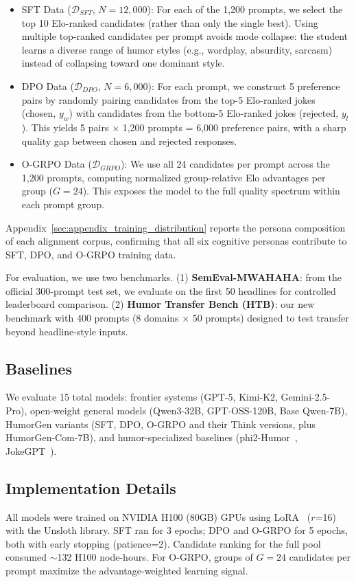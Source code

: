 \documentclass[11pt]{article}
\begin{document}
\begin{itemize}
    \item SFT Data ($\mathcal{D}_{SFT}$, $N=12,000$): For each of the 1,200 prompts, we select the top 10 Elo-ranked candidates (rather than only the single best). Using multiple top-ranked candidates per prompt avoids mode collapse: the student learns a diverse range of humor styles (e.g., wordplay, absurdity, sarcasm) instead of collapsing toward one dominant style.
    \item DPO Data ($\mathcal{D}_{DPO}$, $N=6,000$): For each prompt, we construct 5 preference pairs by randomly pairing candidates from the top-5 Elo-ranked jokes (chosen, $y_w$) with candidates from the bottom-5 Elo-ranked jokes (rejected, $y_l$). This yields 5 pairs $\times$ 1,200 prompts = 6,000 preference pairs, with a sharp quality gap between chosen and rejected responses.
    \item O-GRPO Data ($\mathcal{D}_{GRPO}$): We use all 24 candidates per prompt across the 1,200 prompts, computing normalized group-relative Elo advantages per group ($G=24$). This exposes the model to the full quality spectrum within each prompt group.
\end{itemize}
Appendix~\ref{sec:appendix_training_distribution} reports the persona composition of each alignment corpus, confirming that all six cognitive personas contribute to SFT, DPO, and O-GRPO training data.

For evaluation, we use two benchmarks. (1) \textbf{SemEval-MWAHAHA}: from the official 300-prompt test set, we evaluate on the first 50 headlines for controlled leaderboard comparison. (2) \textbf{Humor Transfer Bench (HTB)}: our new benchmark with 400 prompts (8 domains $\times$ 50 prompts) designed to test transfer beyond headline-style inputs.

\subsection{Baselines}
We evaluate 15 total models: frontier systems (GPT-5, Kimi-K2, Gemini-2.5-Pro), open-weight general models (Qwen3-32B, GPT-OSS-120B, Base Qwen-7B), HumorGen variants (SFT, DPO, O-GRPO and their Think versions, plus HumorGen-Com-7B), and humor-specialized baselines (phi2-Humor~\cite{abbas2026phi2humor}, JokeGPT~\cite{tzj2006jokegpt}).


\subsection{Implementation Details}
All models were trained on NVIDIA H100 (80GB) GPUs using LoRA~\cite{hu2022lora} ($r$=16) with the Unsloth library. SFT ran for 3 epochs; DPO and O-GRPO for 5 epochs, both with early stopping (patience=2). Candidate ranking for the full pool consumed $\sim$132 H100 node-hours. For O-GRPO, groups of $G=24$ candidates per prompt maximize the advantage-weighted learning signal.
\end{document}
